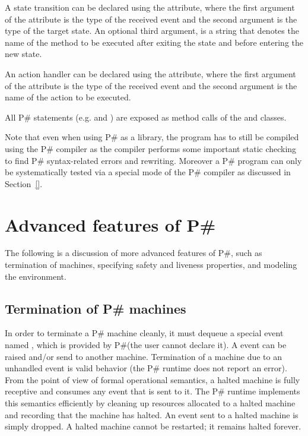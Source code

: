 \documentclass{llncs}
\newcommand{\ps}{P\#\xspace}
\begin{document}
A state transition can be declared using the \inlinepsharp{[OnEventGotoState(...)]} attribute, where the first argument of the attribute is the type of the received event and the second argument is the type of the target state. An optional third argument, is a string that denotes the name of the method to be executed after exiting the state and before entering the new state.

An action handler can be declared using the \inlinepsharp{[OnEventDoAction(...)]} attribute, where the first argument of the attribute is the type of the received event and the second argument is the name of the action to be executed.

All \ps statements (e.g.  and ) are exposed as method calls of the  and  classes.

Note that even when using \ps as a library, the program has to still be compiled using the \ps compiler as the compiler performs some important static checking to find \ps syntax-related errors and rewriting. Moreover a \ps program can only be systematically tested via a special mode of the \ps compiler as discussed in Section~\ref{}.


\section{Advanced features of \ps}
\label{sec:advanced}

The following is a discussion of more advanced features of \ps, such as termination of machines, specifying safety and liveness properties, and modeling the environment.

\subsection{Termination of \ps machines}
\label{sec:termination}

In order to terminate a \ps machine cleanly, it must dequeue a special event named , which is provided by \ps (the user cannot declare it). A  event can be raised and/or send to another machine. Termination of a machine due to an unhandled  event is valid behavior (the \ps runtime does not report an error). From the point of view of formal operational semantics, a halted machine is fully receptive and consumes any event that is sent to it. The \ps runtime implements this semantics efficiently by cleaning up resources allocated to a halted machine and recording that the machine has halted. An event sent to a halted machine is simply dropped. A halted machine cannot be restarted; it remains halted forever.
\end{document}
